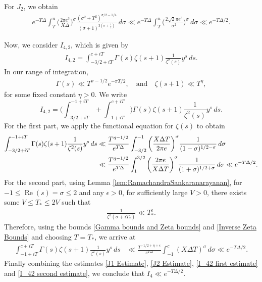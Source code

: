 \documentclass[11pt]{amsart}
\numberwithin{equation}{section}
\numberwithin{figure}{section}
\theoremstyle{definition}
\begin{document}
For $J_2$, we obtain
\begin{align}
e^{-T\Delta}\int_{T}^{u}  \bigg (\frac{2\pi e^3}{X\Delta} \bigg)^{\sigma} \frac{(\sigma^2+T^2 )^{\sigma/2-1/4}}{ (\sigma+1)^{3(\sigma+\frac{1}{2})}} \,d\sigma \ll  e^{-T\Delta}\int_{T}^{u}  \bigg (\frac{2\sqrt{2}\pi e^3}{\sigma^2} \bigg)^{\sigma}  \,d\sigma \ll  e^{-T\Delta/2}. \label{J2 Estimate}
\end{align}

Now, we consider $I_{4,2}$, which is given by
\begin{align*}
    I_{4,2} = \int_{-3/2+iT}^{c+iT} \Gamma(s) \zeta(s+1) \frac{1}{\zeta^2(s)} y^s \,ds.
\end{align*}
In our range of integration,
\begin{align}\label{Gamma bounds and Zeta bounds}
\Gamma(s) \ll T^{\sigma-1/2}e^{-\pi T/2}, \quad \textrm{and} \quad  \zeta(s+1) \ll T^\eta,
\end{align}
for some fixed constant $\eta>0$. We write
\[
I_{4,2} = \bigg(\int_{-3/2+iT}^{-1+iT} +\int_{-1+iT}^{c+iT}\bigg) \Gamma(s) \zeta(s+1) \frac{1}{\zeta^2(s)} y^s \,ds.
\]
For the first part, we apply the functional equation for $\zeta(s)$ to obtain
\begin{align}
\int_{-3/2+iT}^{-1+iT} \Gamma(s) \zeta(s+1) \frac{1}{\zeta^2(s)} y^s \,ds &\ll \frac{T^{\eta-1/2}}{e^{T\Delta}}\int_{-3/2}^{-1}
\bigg(\frac{X\Delta T}{2\pi e}\bigg)^{\sigma}\frac{1}{(1-\sigma)^{1/2-\sigma}} \,d\sigma  \notag\\ 
&\ll \frac{T^{\eta-1/2}}{e^{ T\Delta}}\int_{1}^{3/2}
\bigg(\frac{2\pi e}{X\Delta T}\bigg)^{\sigma}\frac{1}{(1+\sigma)^{1/2+\sigma}} \,d\sigma \ll e^{- T\Delta /2}. \label{I_42 first estimate}
\end{align}
For the second part, using Lemma \ref{lem:RamachandraSankaranarayanan}, for $-1 \leqslant\operatorname{Re}(s)=\sigma \leqslant 2$ and any $\epsilon>0$, for sufficiently large $V>0$, there exists some $V \leqslant T_{*} \leqslant 2V$ such that
\begin{align}\label{Inverse Zeta Bounds}
\frac{1}{\zeta^2(\sigma+iT_{*})}\ll T_{*}^{\epsilon}.  
\end{align}
Therefore, using the bounds \eqref{Gamma bounds and Zeta bounds} and \eqref{Inverse Zeta Bounds} and choosing $T=T_{*}$, we arrive at
\begin{align}
\int_{-1+iT}^{c+iT} \Gamma(s) \zeta(s+1) \frac{1}{\zeta^2(s)} y^s \,ds &\ll  \frac{T^{-1/2+\eta+\epsilon}}{e^{T\Delta}}\int_{-1}^{c}
(X\Delta T)^{\sigma} \,d\sigma \ll  e^{- T\Delta /2}. \label{I_42 second estimate}
\end{align}
Finally combining the estimates \eqref{J1 Estimate}, \eqref{J2 Estimate}, \eqref{I_42 first estimate} and \eqref{I_42 second estimate}, we conclude that $I_4 \ll e^{- T\Delta /2}.$
\end{document}
